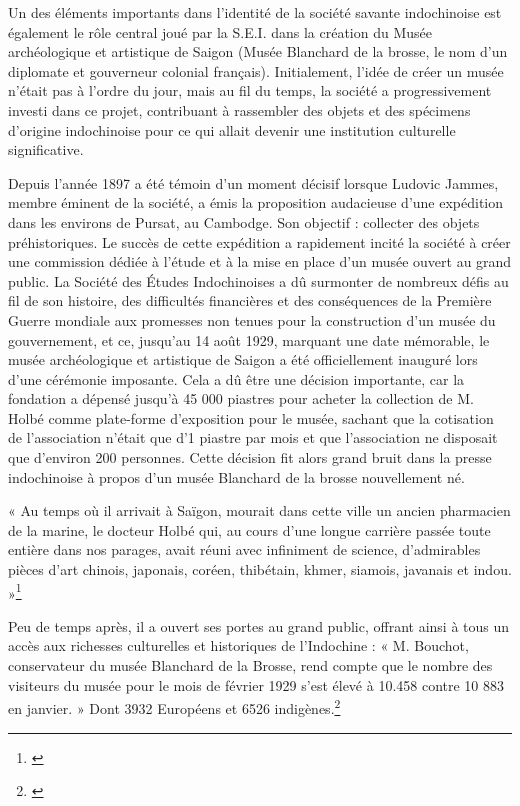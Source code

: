 Un des éléments importants dans l'identité de la société savante indochinoise est également le rôle central joué par la S.E.I. dans la création du Musée archéologique et artistique de Saigon (Musée Blanchard de la brosse, le nom d'un diplomate et gouverneur colonial français). Initialement, l'idée de créer un musée n'était pas à l'ordre du jour, mais au fil du temps, la société a progressivement investi dans ce projet, contribuant à rassembler des objets et des spécimens d'origine indochinoise pour ce qui allait devenir une institution culturelle significative.

Depuis l'année 1897 a été témoin d'un moment décisif lorsque Ludovic Jammes, membre éminent de la société, a émis la proposition audacieuse d'une expédition dans les environs de Pursat, au Cambodge. Son objectif : collecter des objets préhistoriques. Le succès de cette expédition a rapidement incité la société à créer une commission dédiée à l'étude et à la mise en place d'un musée ouvert au grand public. La Société des Études Indochinoises a dû surmonter de nombreux défis au fil de son histoire, des difficultés financières et des conséquences de la Première Guerre mondiale aux promesses non tenues pour la construction d'un musée du gouvernement, et ce, jusqu'au 14 août 1929, marquant une date mémorable, le musée archéologique et artistique de Saigon a été officiellement inauguré lors d'une cérémonie imposante. Cela a dû être une décision importante, car la fondation a dépensé jusqu'à 45 000 piastres pour acheter la collection de M. Holbé comme plate-forme d'exposition pour le musée, sachant que la cotisation de l'association n'était que d'1 piastre par mois et que l'association ne disposait que d'environ 200 personnes. Cette décision fit alors grand bruit dans la presse indochinoise à propos d'un musée Blanchard de la brosse nouvellement né.  

« Au temps où il arrivait à Saïgon, mourait dans cette ville un ancien pharmacien de la marine, le docteur Holbé qui, au cours d'une longue carrière passée toute entière dans nos parages, avait réuni avec infiniment de science, d'admirables pièces d'art chinois, japonais, coréen, thibétain, khmer, siamois, javanais et indou. »\footnote{\cite{collection}}

Peu de temps après, il a ouvert ses portes au grand public, offrant ainsi à tous un accès aux richesses culturelles et historiques de l'Indochine :
« M. Bouchot, conservateur du musée Blanchard de
la Brosse, rend compte que le nombre des visiteurs du musée pour le mois de février 1929 s’est élevé à 10.458 contre 10 883 en janvier. » Dont 3932 Européens et 6526 indigènes.\footnote{\cite{bouchot}}

